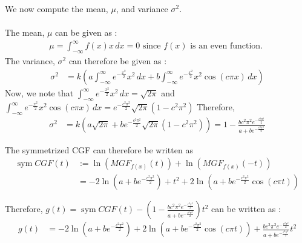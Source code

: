 \documentclass[letterpaper]{article}
\DeclareMathOperator{\sym}{sym}
\begin{document}
\noindent
We now compute the mean, $\mu$, and variance $\sigma^{2}$. \\ \\
\noindent
The mean, $\mu$ can be given as :
\begin{align*}
    \mu = \int_{-\infty}^{\infty} f(x)x \,dx = 0 \text{  since } f(x) \text{ is an even function. }
\end{align*} 
The variance, $\sigma^{2}$ can therefore be given as :
\begin{align*}
    \sigma^{2} %
    &= k\left(a\int_{-\infty}^{\infty} e^{-\frac{x^{2}}{2}}x^{2}\,dx + b\int_{-\infty}^{\infty} e^{-\frac{x^{2}}{2}}x^{2}\cos(c\pi x) \,dx\right)
\end{align*}
Now, we note that $\int_{-\infty}^{\infty} e^{-\frac{x^{2}}{2}}x^{2}\,dx = \sqrt{2\pi}$ and $\int_{-\infty}^{\infty} e^{-\frac{x^{2}}{2}}x^{2}\cos(c\pi x) \,dx = e^{-\frac{c^{2}\pi^{2}}{2}}\sqrt{2\pi}(1 - c^{2}\pi^{2})$
Therefore, 
\begin{align*}
    \sigma^{2} &= k\left(a\sqrt{2\pi} + be^{-\frac{c^{2}\pi^{2}}{2}}\sqrt{2\pi}(1 - c^{2}\pi^{2})\right) 
    = 1 - \frac{bc^{2}\pi^{2}e^{-\frac{c^{2}\pi^{2}}{2}}}{a + be^{-\frac{c^{2}\pi^{2}}{2}}}
\end{align*}

The symmetrized CGF can therefore be written as 
\begin{align*}
    \sym CGF(t) &:= \ln(MGF_{f(x)}(t)) + \ln(MGF_{f(x)}(-t)) \\ 
    &= -2\ln(a + be^{-\frac{c^{2}\pi^{2}}{2}}) + t^2 + 2\ln(a + be^{-\frac{c^{2}\pi^{2}}{2}}\cos(c\pi t))
\end{align*}

Therefore, $g(t) = \sym CGF(t) - (1 - \frac{bc^{2}\pi^{2}e^{-\frac{c^{2}\pi^{2}}{2}}}{a + be^{-\frac{c^{2}\pi^{2}}{2}}})t^{2}$ can be written as : \begin{align*} g(t) &= -2\ln(a + be^{-\frac{c^{2}\pi^{2}}{2}}) + 2\ln(a + be^{-\frac{c^{2}\pi^{2}}{2}}\cos(c\pi t)) + \frac{bc^{2}\pi^{2}e^{-\frac{c^{2}\pi^{2}}{2}}}{a + be^{-\frac{c^{2}\pi^{2}}{2}}}t^2
\end{align*}
\end{document}
